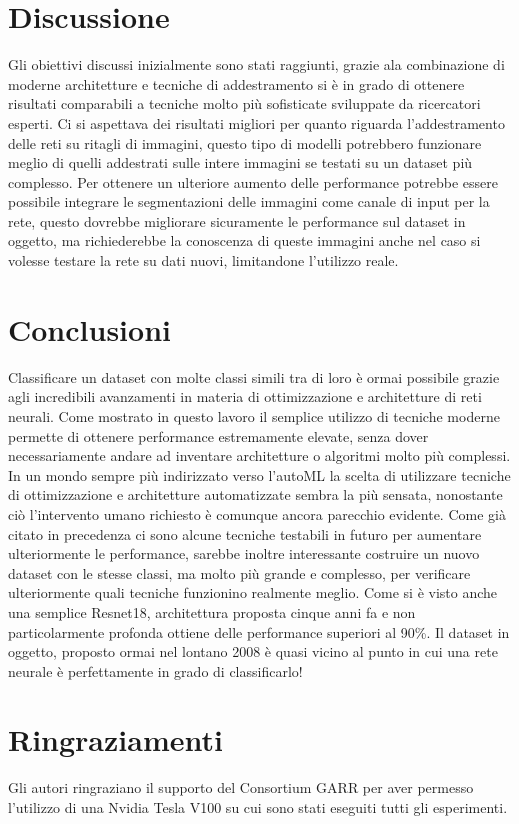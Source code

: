 \section{Discussione}
Gli obiettivi discussi inizialmente sono stati raggiunti, grazie ala combinazione di moderne architetture e tecniche di addestramento si è in grado di ottenere risultati comparabili a tecniche molto più sofisticate sviluppate da ricercatori esperti. Ci si aspettava dei risultati migliori per quanto riguarda l'addestramento delle reti su ritagli di immagini, questo tipo di modelli potrebbero funzionare meglio di quelli addestrati sulle intere immagini se testati su un dataset più complesso. Per ottenere un ulteriore aumento delle performance potrebbe essere possibile integrare le segmentazioni delle immagini come canale di input per la rete, questo dovrebbe migliorare sicuramente le performance sul dataset in oggetto, ma richiederebbe la conoscenza di queste immagini anche nel caso si volesse testare la rete su dati nuovi, limitandone l'utilizzo reale.
\newpage
\section{Conclusioni}
Classificare un dataset con molte classi simili tra di loro è ormai possibile grazie agli incredibili avanzamenti in materia di ottimizzazione e architetture di reti neurali. Come mostrato in questo lavoro il semplice utilizzo di tecniche moderne permette di ottenere performance estremamente elevate, senza dover necessariamente andare ad inventare architetture o algoritmi molto più complessi. In un mondo sempre più indirizzato verso l'autoML la scelta di utilizzare tecniche di ottimizzazione e architetture automatizzate sembra la più sensata, nonostante ciò l'intervento umano richiesto è comunque ancora parecchio evidente. Come già citato in precedenza ci sono alcune tecniche testabili in futuro per aumentare ulteriormente le performance, sarebbe inoltre interessante costruire un nuovo dataset con le stesse classi, ma molto più grande e complesso, per verificare ulteriormente quali tecniche funzionino realmente meglio. Come si è visto anche una semplice Resnet18, architettura proposta cinque anni fa e non particolarmente profonda ottiene delle performance superiori al 90\%. Il dataset in oggetto, proposto ormai nel lontano 2008 è quasi vicino al punto in cui una rete neurale è perfettamente in grado di classificarlo!

\section*{Ringraziamenti}
Gli autori ringraziano il supporto del Consortium GARR per aver permesso l'utilizzo di una Nvidia Tesla V100 su cui sono stati eseguiti tutti gli esperimenti.
\newpage



